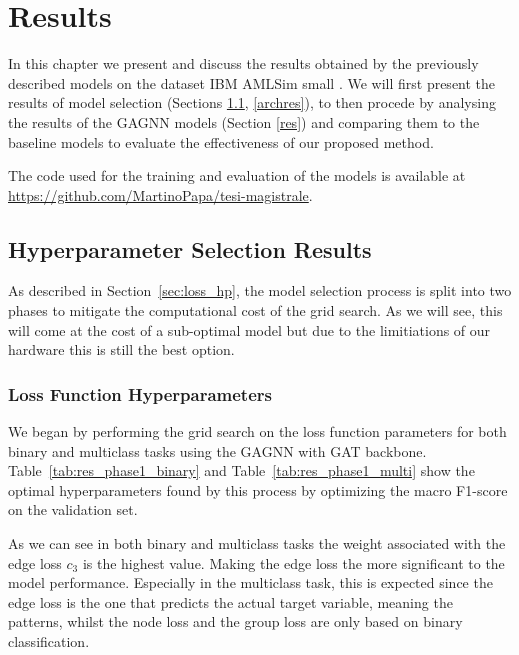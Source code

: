 \chapter{Results}
\label{results}

In this chapter we present and discuss the results obtained by the previously described models on the dataset IBM AMLSim small \cite{AMLWorld}. We will first present the results of model selection (Sections \ref{modelselres}, \ref{archres}), to then procede by analysing the results of the GAGNN models (Section \ref{res}) and comparing them to the baseline models to evaluate the effectiveness of our proposed method.

The code used for the training and evaluation of the models is available at \url{https://github.com/MartinoPapa/tesi-magistrale}.

\section{Hyperparameter Selection Results}\label{modelselres}
As described in Section~\ref{sec:loss_hp}, the model selection process is split into two phases to mitigate the computational cost of the grid search. As we will see, this will come at the cost of a sub-optimal model but due to the limitiations of our hardware this is still the best option.

\subsection{Loss Function Hyperparameters}
We began by performing the grid search on the loss function parameters for both binary and multiclass tasks using the GAGNN with GAT backbone. Table~\ref{tab:res_phase1_binary} and Table~\ref{tab:res_phase1_multi} show the optimal hyperparameters found by this process by optimizing the macro F1-score on the validation set.

As we can see in both binary and multiclass tasks the weight associated with the edge loss \(c_3\) is the highest value. Making the edge loss the more significant to the model performance. Especially in the multiclass task, this is expected since the edge loss is the one that predicts the actual target variable, meaning the patterns, whilst the node loss and the group loss are only based on binary classification.

